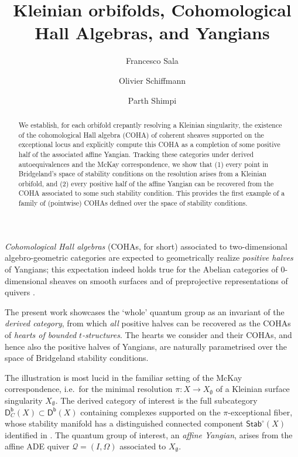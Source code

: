 \documentclass[reqno,a4paper]{amsart}
\title[Kleinian orbifolds, Cohomological Hall Algebras, and Yangians]{Kleinian orbifolds, Cohomological Hall Algebras, and Yangians}
\author[F.~Sala]{Francesco Sala}
\author[O.~Schiffmann]{Olivier Schiffmann}
\author[P.~Shimpi]{Parth Shimpi}
\newcommand{\Stab}{\mathsf{Stab}}
\newcommand{\catDb}{\mathsf{D}^\mathsf{b}}
\newcommand{\qv}{\mathcal{Q}}
\newcommand{\rsv}{X}
\newcommand{\ssv}{X_\emptyset}
\theoremstyle{basic-theorem}
\numberwithin{equation}{section}
\begin{document}
 

\begin{abstract} 
    We establish, for each orbifold crepantly resolving a Kleinian singularity,
    the existence of the cohomological Hall algebra (COHA) of coherent sheaves
    supported on the exceptional locus and explicitly compute this COHA as a
    completion of some positive half of the associated affine Yangian. Tracking
    these categories under derived autoequivalences and the McKay
    correspondence, we show that (1) every point in Bridgeland's space of
    stability conditions on the resolution arises from a Kleinian orbifold, and
    (2) every positive half of the affine Yangian can be recovered from the COHA
    associated to some such stability condition. This provides the first example
    of a family of (pointwise) COHAs defined over the space of stability
    conditions.
\end{abstract}

\maketitle
\thispagestyle{empty}



\textit{Cohomological Hall algebras} (COHAs, for short) associated to
two-dimensional algebro-geometric categories are expected to geometrically
realize \textit{positive halves} of Yangians; this expectation indeed holds true
for the Abelian categories of 0-dimensional sheaves on smooth surfaces
\cite{MMSV} and of preprojective representations of quivers \cite{BD_Okounkov,
SV_Yangians=COHA}.

The present work showcases the `whole' quantum group as an invariant of the
\textit{derived category}, from which \textit{all} positive halves
can be recovered as the COHAs of \textit{hearts of bounded $t$-structures}. The
hearts we consider and their COHAs, and hence also the positive halves of
Yangians, are naturally parametrised over the space of Bridgeland stability
conditions.

The illustration is most lucid in the familiar setting of the McKay correspondence, i.e.\ for the minimal resolution $\pi\colon\rsv\to \ssv$ of a Kleinian surface singularity $\ssv$. The derived category of interest is the full subcategory $\catDb_C(\rsv)\subset \catDb(\rsv)$ containing complexes supported on the $\pi$-exceptional fiber, whose stability manifold has a distinguished connected component $\Stab^\circ(\rsv)$ identified in \cite{Stab_Kleinian}. The quantum group of interest, an \textit{affine Yangian}, arises from the affine ADE quiver $\qv=(I,\Omega)$ associated to $\ssv$.
\end{document}
